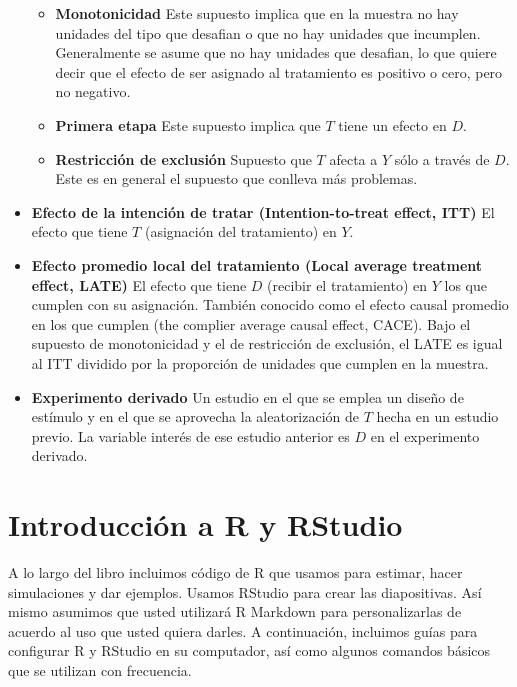 \documentclass[
  12pt,
  spanish,
]{book}
\providecommand{\tightlist}{%
  \setlength{\itemsep}{0pt}\setlength{\parskip}{0pt}}
\begin{document}
\begin{itemize}
  \begin{itemize}
  \tightlist
  \item
    \textbf{Monotonicidad} Este supuesto implica que en la muestra no hay unidades del tipo que desafian o que no hay unidades que incumplen. Generalmente se asume que no hay unidades que desafian, lo que quiere decir que el efecto de ser asignado al tratamiento es positivo o cero, pero no negativo.
  \item
    \textbf{Primera etapa} Este supuesto implica que \(T\) tiene un efecto en \(D\).
  \item
    \textbf{Restricción de exclusión} Supuesto que \(T\) afecta a \(Y\) sólo a través de \(D\). Este es en general el supuesto que conlleva más problemas.
  \end{itemize}
\item
  \textbf{Efecto de la intención de tratar (Intention-to-treat effect, ITT)} El efecto que tiene \(T\) (asignación del tratamiento) en \(Y\).
\item
  \textbf{Efecto promedio local del tratamiento (Local average treatment effect, LATE)} El efecto que tiene \(D\) (recibir el tratamiento) en \(Y\) los que cumplen con su asignación. También conocido como el efecto causal promedio en los que cumplen (the complier average causal
  effect, CACE). Bajo el supuesto de monotonicidad y el de restricción de exclusión, el LATE es igual al ITT dividido por la proporción de unidades que cumplen en la muestra.
\item
  \textbf{Experimento derivado} Un estudio en el que se emplea un diseño de estímulo y en el que se aprovecha la aleatorización de \(T\) hecha en un estudio previo. La variable interés de ese estudio anterior es \(D\) en el experimento derivado.
\end{itemize}

\hypertarget{introducciuxf3n-a-r-y-rstudio}{%
\chapter{Introducción a R y RStudio}\label{introducciuxf3n-a-r-y-rstudio}}

A lo largo del libro incluimos código de R que usamos para estimar, hacer simulaciones y dar ejemplos. Usamos RStudio para crear las diapositivas. Así mismo asumimos que usted utilizará R Markdown para personalizarlas de acuerdo al uso que usted quiera darles. A continuación, incluimos guías para configurar R y RStudio en su computador, así como algunos comandos básicos que se utilizan con frecuencia.
\end{document}

